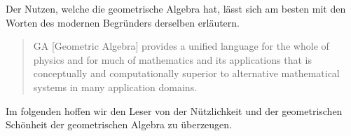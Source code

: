 
Der Nutzen, welche die geometrische Algebra hat, lässt sich am besten mit den Worten des modernen
Begründers derselben erläutern.
%

\begin{quote}
GA [Geometric Algebra]
provides a unified language for the whole of physics and for much of mathematics and its applications that is conceptually and computationally superior to alternative mathematical systems in many application domains. \cite{clifford:hestenes_GA} 
\end{quote}

Im folgenden hoffen wir den Leser von der Nützlichkeit und der geometrischen Schönheit der geometrischen Algebra zu überzeugen.

